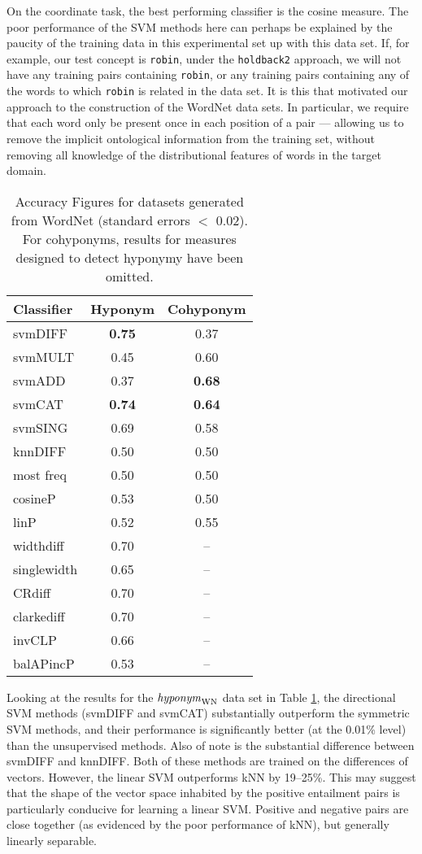 \documentclass[11pt]{article}
\newcommand\entWN{\mbox{\em hyponym\/}_{\mbox{\scriptsize WN}}}
\begin{document}
On the coordinate task, the best performing classifier is the cosine measure. The poor performance of the SVM methods here can perhaps be explained by the paucity of the training data in this experimental set up with this data set.  If, for example, our test concept is \texttt{robin}, under the \texttt{holdback2} approach, we will not have any training pairs containing \texttt{robin}, or any training pairs containing any of the words to which \texttt{robin} is related in the data set.  It is this that motivated our approach to the construction of the WordNet data sets. In particular, we require that each word only be present once in each position of a pair --- allowing us to remove the implicit ontological information from the training set, without removing all knowledge of the distributional features of words in the target domain.

\begin{table}[ht]
\centering
\begin{tabular}{|l|c|c|}
\hline
Classifier&Hyponym&Cohyponym\\
\hline
svmDIFF&\textbf{0.75}&0.37\\
svmMULT&0.45&0.60\\
svmADD&0.37&\textbf{0.68}\\
svmCAT&\textbf{0.74}&\textbf{0.64}\\
svmSING&0.69&0.58\\
knnDIFF&0.50&0.50\\
\hline
most freq&0.50&0.50\\
cosineP&0.53&0.50\\
linP&0.52&0.55\\
widthdiff&0.70&--\\
singlewidth&0.65&--\\
CRdiff&0.70&--\\
clarkediff&0.70&--\\
invCLP&0.66&--\\
balAPincP&0.53&--\\
\hline
\end{tabular}
\caption{Accuracy Figures for datasets generated from WordNet
  (standard errors $<$ 0.02). For cohyponyms, results for measures
  designed to detect hyponymy have been omitted.}
\label{table:results_WN}
\end{table}

Looking at the results for the $\entWN$ data set in Table \ref{table:results_WN}, the directional SVM methods (svmDIFF and svmCAT)  substantially outperform the symmetric SVM methods, and their performance is significantly better (at the 0.01\% level) than the unsupervised methods.  Also of note is the substantial difference between svmDIFF and knnDIFF.  Both of these methods are trained on the differences of vectors.  However, the linear SVM outperforms kNN by 19--25\%.  This may suggest that the shape of the vector space inhabited by the positive entailment pairs is particularly conducive for learning a linear SVM.  Positive and negative pairs are close together (as evidenced by the poor performance of kNN), but generally linearly separable.
\end{document}
